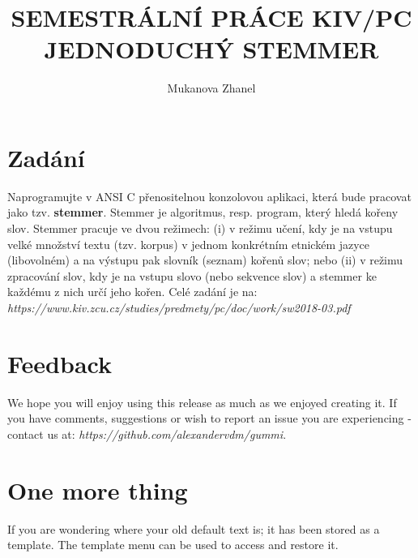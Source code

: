 \documentclass[11pt]{article}
\title{\textbf{ SEMESTRÁLNÍ PRÁCE KIV/PC
JEDNODUCHÝ STEMMER}}
\author{Mukanova Zhanel}
\date{}
\begin{document}
\maketitle

\section{Zadání}

Naprogramujte v ANSI C přenositelnou konzolovou aplikaci, která bude pracovat jako tzv.
\textbf{stemmer}. Stemmer je algoritmus, resp. program, který hledá kořeny slov. Stemmer pracuje ve
dvou režimech: (i) v režimu učení, kdy je na vstupu velké množství textu (tzv. korpus) v jednom
konkrétním etnickém jazyce (libovolném) a na výstupu pak slovník (seznam) kořenů slov; nebo
(ii) v režimu zpracování slov, kdy je na vstupu slovo (nebo sekvence slov) a stemmer ke každému
z nich určí jeho kořen.
Celé zadání je na: \emph{https://www.kiv.zcu.cz/studies/predmety/pc/doc/work/sw2018-03.pdf}	
\section{Feedback}
We hope you will enjoy using this release as much as we enjoyed creating it. If you have comments, suggestions or wish to report an issue you are experiencing - contact us at: \emph{https://github.com/alexandervdm/gummi}.

\section{One more thing}
If you are wondering where your old default text is; it has been stored as a template. The template menu can be used to access and restore it. 
\end{document}
